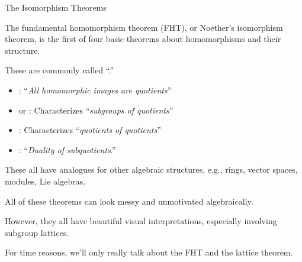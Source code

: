 \documentclass[8pt, handout]{beamer}
\newcommand{\Pause}{}      %
\begin{document}
\begin{frame}{The Isomorphism Theorems}
  
  The fundamental homomorphism theorem (FHT), or Noether's isomorphism theorem, is the first of four
  basic theorems about homomorphisms and their structure. 
  
  \bigskip\Pause
  
  These are commonly called ``.''   \smallskip\Pause
  
  \begin{itemize}
  \item {}: ``\emph{All homomorphic images are quotients}''  \smallskip\Pause
  \item {} or : Characterizes ``\emph{subgroups of quotients}'' \smallskip\Pause
  \item {}: Characterizes ``\emph{quotients of quotients}'' \smallskip\Pause
  \item {}: ``\emph{Duality of subquotients}.'' \smallskip\Pause
  \end{itemize}
  
  These all have analogues for other algebraic structures, e.g.,
  rings, vector spaces, modules, Lie algebras.
  
  \bigskip\Pause
  
  All of these theorems can look messy and unmotivated algebraically.
  
  \bigskip\Pause
  
  However, they all have beautiful visual interpretations, especially
  involving subgroup lattices.

  \bigskip\Pause

  For time reasons, we'll only really talk about the FHT and the lattice theorem.
  
\end{frame}

\end{document}
